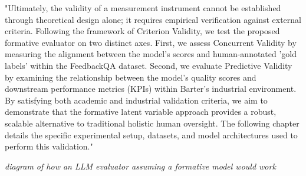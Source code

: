 "Ultimately, the validity of a measurement instrument cannot be established through theoretical design alone; it requires empirical verification against external criteria. Following the framework of Criterion Validity, we test the proposed formative evaluator on two distinct axes. First, we assess Concurrent Validity by measuring the alignment between the model’s scores and human-annotated 'gold labels' within the FeedbackQA dataset. Second, we evaluate Predictive Validity by examining the relationship between the model's quality scores and downstream performance metrics (KPIs) within Barter’s industrial environment. By satisfying both academic and industrial validation criteria, we aim to demonstrate that the formative latent variable approach provides a robust, scalable alternative to traditional holistic human oversight. The following chapter details the specific experimental setup, datasets, and model architectures used to perform this validation."


\textit{diagram of how an LLM evaluator assuming a formative model would work}